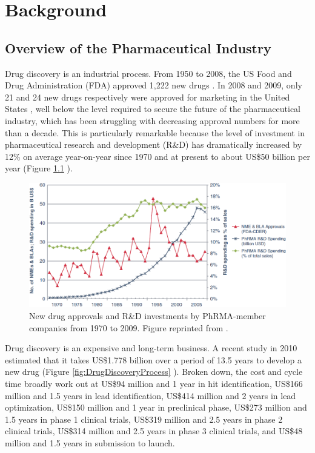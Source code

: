 \chapter{Background}

\section{Overview of the Pharmaceutical Industry}

Drug discovery is an industrial process. From 1950 to 2008, the US Food and Drug Administration (FDA) approved 1,222 new drugs \citep{717}. In 2008 and 2009, only 21 and 24 new drugs respectively were approved for marketing in the United States \citep{716}, well below the level required to secure the future of the pharmaceutical industry, which has been struggling with decreasing approval numbers for more than a decade. This is particularly remarkable because the level of investment in pharmaceutical research and development (R\&D) has dramatically increased by 12\% on average year-on-year since 1970 and at present to about US\$50 billion per year (Figure \ref{fig:NewDrugApprovals} \citep{686}).

\begin{figure}
\centering
\includegraphics[width=\textwidth]{Figures/NewDrugApprovals.png}
\caption{New drug approvals and R\&D investments by PhRMA-member companies from 1970 to 2009. Figure reprinted from \citep{686}.}
\label{fig:NewDrugApprovals}
\end{figure}

Drug discovery is an expensive and long-term business. A recent study in 2010 estimated that it takes US\$1.778 billion over a period of 13.5 years to develop a new drug (Figure \ref{fig:DrugDiscoveryProcess} \citep{716}). Broken down, the cost and cycle time broadly work out at US\$94 million and 1 year in hit identification, US\$166 million and 1.5 years in lead identification, US\$414 million and 2 years in lead optimization, US\$150 million and 1 year in preclinical phase, US\$273 million and 1.5 years in phase 1 clinical trials, US\$319 million and 2.5 years in phase 2 clinical trials, US\$314 million and 2.5 years in phase 3 clinical trials, and US\$48 million and 1.5 years in submission to launch.

